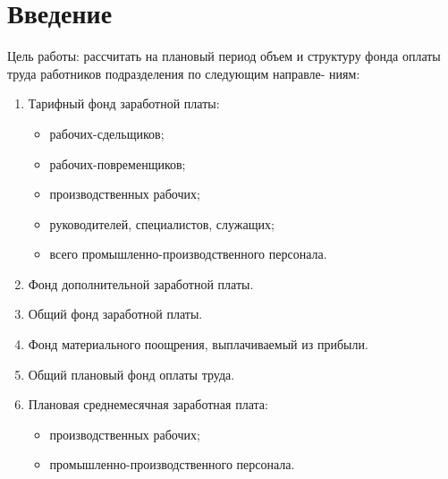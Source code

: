 \chapter{Введение}

Цель работы: рассчитать на плановый период объем и структуру фонда оплаты труда работников подразделения по следующим направле-
ниям:

\begin{enumerate}
	\item Тарифный фонд заработной платы:
	\begin{itemize}
		\item рабочих-сдельщиков;
		\item рабочих-повременщиков;
		\item производственных рабочих;
		\item руководителей, специалистов, служащих;
		\item всего промышленно-производственного персонала.
	\end{itemize}
	\item Фонд дополнительной заработной платы.
	\item Общий фонд заработной платы.
	\item Фонд материального поощрения, выплачиваемый из прибыли.
	\item Общий плановый фонд оплаты труда.
	\item Плановая среднемесячная заработная плата:
	\begin{itemize}
		\item производственных рабочих;
		\item промышленно-производственного персонала.
	\end{itemize}
	
\end{enumerate}

